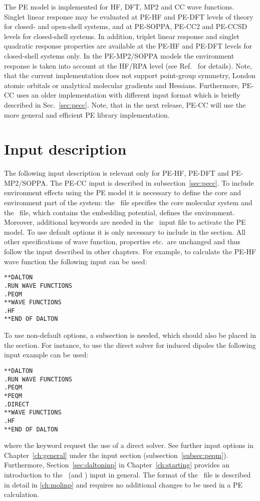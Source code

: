 The PE model is implemented for HF, DFT, MP2 and
CC wave functions. Singlet linear response may be evaluated
at PE-HF and PE-DFT levels of theory for closed- and open-shell systems,
and at PE-SOPPA, PE-CC2 and PE-CCSD levels for closed-shell systems.
In addition, triplet linear response and singlet quadratic response
properties are available at the PE-HF and PE-DFT levels for closed-shell
systems only. In the PE-MP2/SOPPA models the environment response is
taken into account at the HF/RPA level (see Ref.~\cite{pesoppa} for details). 
Note, that the current implementation 
does not support point-group symmetry, London atomic orbitals or analytical 
molecular gradients and Hessians. Furthermore, PE-CC uses 
an older implementation with different input format which is briefly described 
in Sec.~\ref{sec:pecc}. Note, that in the next release, PE-CC will use the
more general and efficient PE library implementation.


\section{Input description}
The following input description is relevant only for PE-HF, PE-DFT and 
PE-MP2/SOPPA. The PE-CC input is described in subsection~\ref{sec:pecc}. To 
include environment effects using the PE model it is 
necessary to define the core and environment part of the system: the \molinp\ 
file specifies the core molecular system and the \potinp\ file, which contains 
the embedding potential, defines the environment. Moreover, additional 
keywords are needed in the \dalinp\ input file to activate the PE model. To use 
default options it is only necessary to include \Key{PEQM} in the \Sec{*DALTON} 
section. All other specifications of wave function, properties etc.\ are
unchanged and thus follow the input described in other chapters. For example, to
calculate the PE-HF wave function the following input can be used:
\begin{verbatim}
**DALTON
.RUN WAVE FUNCTIONS
.PEQM
**WAVE FUNCTIONS
.HF
**END OF DALTON
\end{verbatim}
To use non-default options, a  subsection is needed, which should also be placed in the 
\Sec{*DALTON} section. For instance, to use the direct solver for induced 
dipoles the following input example can be used:
\begin{verbatim}
**DALTON
.RUN WAVE FUNCTIONS
.PEQM
*PEQM
.DIRECT
**WAVE FUNCTIONS
.HF
**END OF DALTON
\end{verbatim}
where the  keyword request the use of a direct solver. See further
input options in Chapter~\ref{ch:general} under the \Sec{PEQM} 
input section (subsection~\ref{subsec:peqm}). Furthermore, 
Section~\ref{sec:daltoninp} in Chapter~\ref{ch:starting} provides an 
introduction to the \dalton\ (and \molinp) input in general. The format of the
\molinp\ file is described in detail in \ref{ch:molinp} and requires no
additional changes to be used in a PE calculation.

